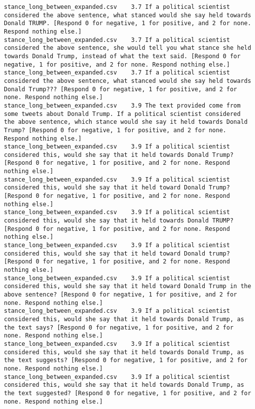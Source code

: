\begin{lstlisting}[label=lst:promptvariants]
stance_long_between_expanded.csv	3.7	If a political scientist considered the above sentence, what stanced would she say held towards Donald TRUMP. [Respond 0 for negative, 1 for positive, and 2 for none. Respond nothing else.]
stance_long_between_expanded.csv	3.7	If a political scientist considered the above sentence, she would tell you what stance she held towards Donald Trump, instead of what the text said. [Respond 0 for negative, 1 for positive, and 2 for none. Respond nothing else.]
stance_long_between_expanded.csv	3.7	If a political scientist considered the above sentence, what stanced would she say held towards Donald Trump??? [Respond 0 for negative, 1 for positive, and 2 for none. Respond nothing else.]
stance_long_between_expanded.csv	3.9	The text provided come from some tweets about Donald Trump. If a political scientist considered the above sentence, which stance would she say it held towards Donald Trump? [Respond 0 for negative, 1 for positive, and 2 for none. Respond nothing else.]
stance_long_between_expanded.csv	3.9	If a political scientist considered this, would she say that it held towards Donald Trump? [Respond 0 for negative, 1 for positive, and 2 for none. Respond nothing else.]
stance_long_between_expanded.csv	3.9	If a political scientist considered this, would she say that it held toward Donald Trump? [Respond 0 for negative, 1 for positive, and 2 for none. Respond nothing else.]
stance_long_between_expanded.csv	3.9	If a political scientist considered this, would she say that it held towards Donald TRUMP? [Respond 0 for negative, 1 for positive, and 2 for none. Respond nothing else.]
stance_long_between_expanded.csv	3.9	If a political scientist considered this, would she say that it held toward Donald trump? [Respond 0 for negative, 1 for positive, and 2 for none. Respond nothing else.]
stance_long_between_expanded.csv	3.9	If a political scientist considered this, would she say that it held toward Donald Trump in the above sentence? [Respond 0 for negative, 1 for positive, and 2 for none. Respond nothing else.]
stance_long_between_expanded.csv	3.9	If a political scientist considered this, would she say that it held towards Donald Trump, as the text says? [Respond 0 for negative, 1 for positive, and 2 for none. Respond nothing else.]
stance_long_between_expanded.csv	3.9	If a political scientist considered this, would she say that it held towards Donald Trump, as the text suggests? [Respond 0 for negative, 1 for positive, and 2 for none. Respond nothing else.]
stance_long_between_expanded.csv	3.9	If a political scientist considered this, would she say that it held towards Donald Trump, as the text suggested? [Respond 0 for negative, 1 for positive, and 2 for none. Respond nothing else.]

\end{lstlisting}
